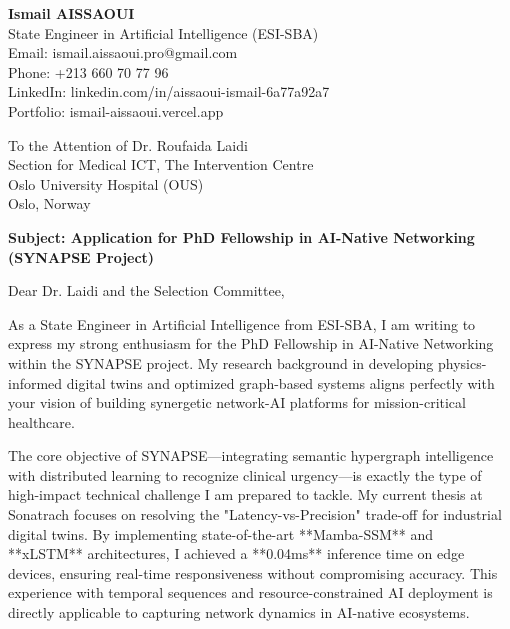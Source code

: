 \documentclass[a4paper,11pt]{letter}
\begin{document}
\begin{flushleft}
    \textbf{Ismail AISSAOUI} \\
    State Engineer in Artificial Intelligence (ESI-SBA) \\
    Email: ismail.aissaoui.pro@gmail.com \\
    Phone: +213 660 70 77 96 \\
    LinkedIn: linkedin.com/in/aissaoui-ismail-6a77a92a7 \\
    Portfolio: ismail-aissaoui.vercel.app
\end{flushleft}

\bigskip

\begin{flushright}
    To the Attention of Dr. Roufaida Laidi \\
    Section for Medical ICT, The Intervention Centre \\
    Oslo University Hospital (OUS) \\
    Oslo, Norway
\end{flushright}

\bigskip

\begin{center}
    \textbf{Subject: Application for PhD Fellowship in AI-Native Networking (SYNAPSE Project)}
\end{center}

\bigskip

Dear Dr. Laidi and the Selection Committee,

As a State Engineer in Artificial Intelligence from ESI-SBA, I am writing to express my strong enthusiasm for the PhD Fellowship in AI-Native Networking within the SYNAPSE project. My research background in developing physics-informed digital twins and optimized graph-based systems aligns perfectly with your vision of building synergetic network-AI platforms for mission-critical healthcare.

The core objective of SYNAPSE—integrating semantic hypergraph intelligence with distributed learning to recognize clinical urgency—is exactly the type of high-impact technical challenge I am prepared to tackle. My current thesis at Sonatrach focuses on resolving the "Latency-vs-Precision" trade-off for industrial digital twins. By implementing state-of-the-art **Mamba-SSM** and **xLSTM** architectures, I achieved a **0.04ms** inference time on edge devices, ensuring real-time responsiveness without compromising accuracy. This experience with temporal sequences and resource-constrained AI deployment is directly applicable to capturing network dynamics in AI-native ecosystems.
\end{document}
